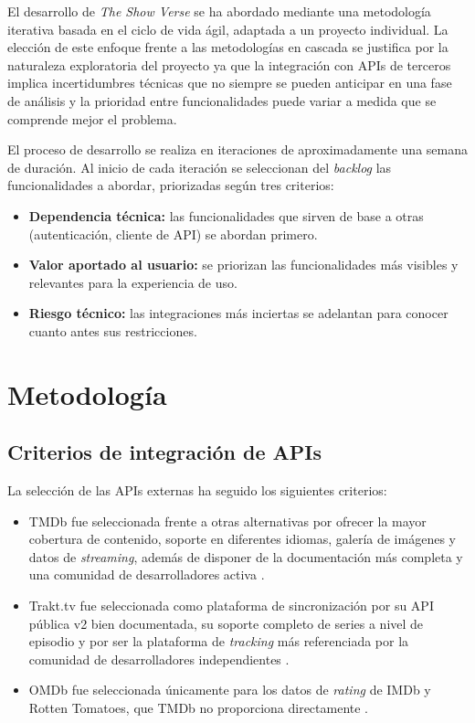 El desarrollo de \textit{The Show Verse} se ha abordado mediante una metodología iterativa basada en el ciclo de vida ágil, adaptada a un proyecto individual. La elección de este enfoque frente a las metodologías en cascada se justifica por la naturaleza exploratoria del proyecto ya que la integración con APIs de terceros implica incertidumbres técnicas que no siempre se pueden anticipar en una fase de análisis y la prioridad entre funcionalidades puede variar a medida que se comprende mejor el problema.

El proceso de desarrollo se realiza en iteraciones de aproximadamente una semana de duración. Al inicio de cada iteración se seleccionan del \textit{backlog} las funcionalidades a abordar, priorizadas según tres criterios:

\begin{itemize}
\item \textbf{Dependencia técnica:} las funcionalidades que sirven de base a otras (autenticación, cliente de API) se abordan primero.
\item \textbf{Valor aportado al usuario:} se priorizan las funcionalidades más visibles y relevantes para la experiencia de uso.
\item \textbf{Riesgo técnico:} las integraciones más inciertas se adelantan para conocer cuanto antes sus restricciones.
\end{itemize}

\section{Metodología}

\subsection{Criterios de integración de APIs}

La selección de las APIs externas ha seguido los siguientes criterios:

\begin{itemize}
\item TMDb fue seleccionada frente a otras alternativas por ofrecer la mayor cobertura de contenido, soporte en diferentes idiomas, galería de imágenes y datos de \textit{streaming}, además de disponer de la documentación más completa y una comunidad de desarrolladores activa \parencite{TMDb:2024}.
\item Trakt.tv fue seleccionada como plataforma de sincronización por su API pública v2 bien documentada, su soporte completo de series a nivel de episodio y por ser la plataforma de \textit{tracking} más referenciada por la comunidad de desarrolladores independientes \parencite{Trakt:2024}.
\item OMDb fue seleccionada únicamente para los datos de \textit{rating} de IMDb y Rotten Tomatoes, que TMDb no proporciona directamente \parencite{OMDb:2024}.
\end{itemize}

